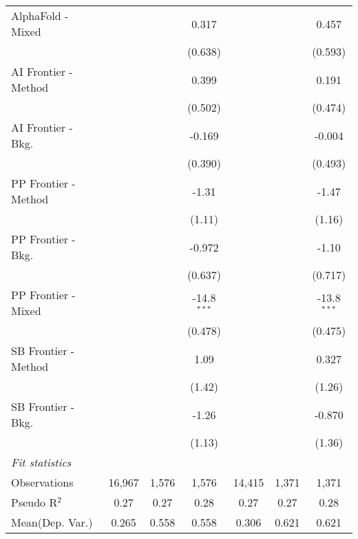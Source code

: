 \begin{tabular}{lcccccc}
   AlphaFold - Mixed    &               &               & 0.317         &               &              & 0.457\\   
                        &               &               & (0.638)       &               &              & (0.593)\\   
   AI Frontier - Method &               &               & 0.399         &               &              & 0.191\\   
                        &               &               & (0.502)       &               &              & (0.474)\\   
   AI Frontier - Bkg.   &               &               & -0.169        &               &              & -0.004\\   
                        &               &               & (0.390)       &               &              & (0.493)\\   
   PP Frontier - Method &               &               & -1.31         &               &              & -1.47\\   
                        &               &               & (1.11)        &               &              & (1.16)\\   
   PP Frontier - Bkg.   &               &               & -0.972        &               &              & -1.10\\   
                        &               &               & (0.637)       &               &              & (0.717)\\   
   PP Frontier - Mixed  &               &               & -14.8$^{***}$ &               &              & -13.8$^{***}$\\   
                        &               &               & (0.478)       &               &              & (0.475)\\   
   SB Frontier - Method &               &               & 1.09          &               &              & 0.327\\   
                        &               &               & (1.42)        &               &              & (1.26)\\   
   SB Frontier - Bkg.   &               &               & -1.26         &               &              & -0.870\\   
                        &               &               & (1.13)        &               &              & (1.36)\\   
   \midrule
   \emph{Fit statistics}\\
   Observations         & 16,967        & 1,576         & 1,576         & 14,415        & 1,371        & 1,371\\  
   Pseudo R$^2$         & 0.27          & 0.27          & 0.28          & 0.27          & 0.27         & 0.28\\  
Mean(Dep. Var.) & 0.265 & 0.558 & 0.558 & 0.306 & 0.621 & 0.621 \\
   

\end{tabular}
